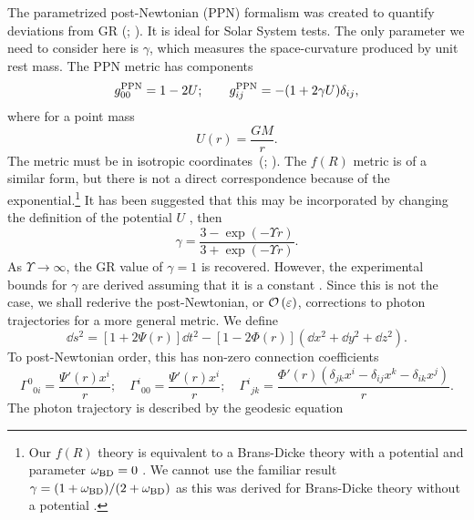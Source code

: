 The parametrized post-Newtonian (PPN) formalism was created to quantify deviations from GR (\citealt[chapter 4]{Will1993}; \citealt{Will2006}). It is ideal for Solar System tests. The only parameter we need to consider here is $\gamma$, which measures the space-curvature produced by unit rest mass. The PPN metric has components
\begin{equation}
g^\mathrm{PPN}_{00} = 1 - 2U; \qquad g^\mathrm{PPN}_{ij} = -(1 + 2\gamma U)\delta_{ij},
\end{equation}
where for a point mass
\begin{equation}
U(r) = \frac{GM}{r}.
\end{equation}
The metric must be in isotropic coordinates~(\citealt[section 40.1]{Misner1973}; \citealt[section 4.1(c)]{Will1993}). The $f(R)$ metric  is of a similar form, but there is not a direct correspondence because of the exponential.\footnote{Our $f(R)$ theory is equivalent to a Brans-Dicke theory with a potential and parameter $\omega_\mathrm{BD} = 0$ \citep{Teyssandier1983, Wands1994}. We cannot use the familiar result $\gamma = (1 + \omega_\mathrm{BD})/(2 + \omega_\mathrm{BD})$ \citep{Will2006} as this was derived for Brans-Dicke theory without a potential \citep[section 5.3]{Will1993}.} It has been suggested that this may be incorporated by changing the definition of the potential $U$ \citep{Olmo2007c, Faulkner2007, Bisabr2010, DeFelice2010}, then
\begin{equation}
\gamma = \frac{3 - \exp(-\Upsilon r)}{3 + \exp(-\Upsilon r)}.
\end{equation}
As $\Upsilon \rightarrow \infty$, the GR value of $\gamma = 1$ is recovered. However, the experimental bounds for $\gamma$ are derived assuming that it is a constant \citep[section 6.1]{Will1993}. Since this is not the case, we shall rederive the post-Newtonian, or $\mathcal{O}\left({\varepsilon}\right)$, corrections to photon trajectories for a more general metric. We define
\begin{equation}
\dd s^2 = \left[1+2\Psi(r)\right]\dd t^2 - \left[1 - 2\Phi(r)\right]\left(\dd x^2 + \dd y^2 + \dd z^2\right).
\end{equation}
To post-Newtonian order, this has non-zero connection coefficients
\begin{equation}
{\Gamma^0}_{0i} = \frac{\Psi'(r) x^i}{r}; \quad {\Gamma^i}_{00} = \frac{\Psi'(r) x^i}{r}; \quad
{\Gamma^i}_{jk} = \frac{\Phi'(r)\left(\delta_{jk}x^i - \delta_{ij}x^k - \delta_{ik}x^j\right)}{r}.
\end{equation}
The photon trajectory is described by the geodesic equation
